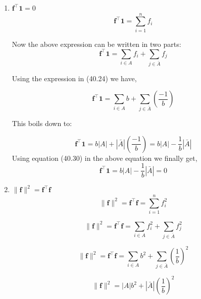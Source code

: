 \documentclass[english]{article}
\theoremstyle{plain}
\begin{document}
\begin{enumerate}
\item $\boldsymbol{f}^{\top}\boldsymbol{1} = 0$
\begin{equation}
\boldsymbol{f}^{\top}\boldsymbol{1} =\sum_{i=1}^{n} f_{i}
\end{equation}

Now the above expression can be written in two parts:
\begin{equation}
\boldsymbol{f}^{\top}\boldsymbol{1} =\sum_{i\in A} f_{i} + \sum_{j \in \bar{A}} f_{j}
\end{equation}

Using the expression in (40.24) we have,

\begin{equation}
\boldsymbol{f}^{\top}\boldsymbol{1} =\sum_{i\in A} b + \sum_{j \in \bar{A}} \left(\frac{-1}{b}\right)
\end{equation}

This boils down to:

\begin{equation}
\boldsymbol{f}^{\top}\boldsymbol{1} = b \left|A\right| + \left|\bar{A}\right| \left(\frac{-1}{b}\right) = b\left|A\right| - \frac{1}{b}\left|\bar{A}\right|
\end{equation}
Using equation (40.30) in the above equation we finally get,
\begin{equation}
\boldsymbol{f}^{\top}\boldsymbol{1} = b\left|A\right| - \frac{1}{b}\left|\bar{A}\right| = 0
\end{equation}

\item $\|\boldsymbol{f}\|^{2} = \boldsymbol{f}^{\top}\boldsymbol{f}$  
\begin{equation}
\|\boldsymbol{f}\|^{2} = \boldsymbol{f}^{\top}\boldsymbol{f} = \sum_{i=1}^{n} f_{i}^{2}
\end{equation}

\begin{equation}
\|\boldsymbol{f}\|^{2} = \boldsymbol{f}^{\top}\boldsymbol{f} = \sum_{i \in A} f_{i}^{2} +  \sum_{j \in \bar{A}} f_{j}^{2}
\end{equation}

\begin{equation}
\|\boldsymbol{f}\|^{2} = \boldsymbol{f}^{\top}\boldsymbol{f} = \sum_{i \in A} b^{2} +  \sum_{j \in \bar{A}} \left( \frac{1} {b}\right)^{2}
\end{equation}

\begin{equation}
\|\boldsymbol{f}\|^{2} =\left|A\right| b^{2} +  \left|\bar{A}\right| \left( \frac{1} {b}\right)^{2}
\end{equation}


\end{enumerate}
\end{document}
